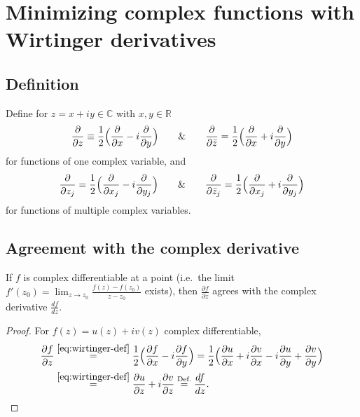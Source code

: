 \documentclass[../../main.tex]{subfiles}
\begin{document}
\section{Minimizing complex functions with Wirtinger derivatives}
\label{sec:wirtinger-derivatives}

\subsection{Definition}

Define for $z=x+iy\in\mathbb C$ with $x,y\in\mathbb R$
\begin{equation}
\frac{\partial}{\partial z}\equiv\frac12\Bigl(\frac{\partial}{\partial x}-i\frac{\partial}{\partial y}\Bigr)
\qquad\&\qquad
\frac{\partial}{\partial\bar z}=\frac12\Bigl(\frac{\partial}{\partial x}+i\frac{\partial}{\partial y}\Bigr)
\label{eq:wirtinger-def}
\end{equation}
for functions of one complex variable, and
\begin{equation}
\frac{\partial}{\partial z_j}=\frac12\Bigl(\frac{\partial}{\partial x_j}-i\frac{\partial}{\partial y_j}\Bigr)
\qquad\&\qquad
\frac{\partial}{\partial\bar z_j}=\frac12\Bigl(\frac{\partial}{\partial x_j}+i\frac{\partial}{\partial y_j}\Bigr)
\end{equation}
for functions of multiple complex variables.

\subsection{Agreement with the complex derivative}

If $f$ is complex differentiable at a point (i.e.\ the limit
$f'(z_0)=\lim_{z\to z_0}\frac{f(z)-f(z_0)}{z-z_0}$ exists), then $\frac{\partial f}{\partial z}$
agrees with the complex derivative $\frac{df}{dz}$.

\begin{proof}
For $f(z)=u(z)+iv(z)$ complex differentiable,
\begin{align}
\frac{\partial f}{\partial z}
&\overset{\eqref{eq:wirtinger-def}}{=}
\frac12\Bigl(\frac{\partial f}{\partial x}-i\frac{\partial f}{\partial y}\Bigr)
=\frac12\Bigl(\frac{\partial u}{\partial x}+i\frac{\partial v}{\partial x}
-i\frac{\partial u}{\partial y}+\frac{\partial v}{\partial y}\Bigr)\notag\\
&\overset{\eqref{eq:wirtinger-def}}{=}\frac{\partial u}{\partial z}+i\frac{\partial v}{\partial z}
\overset{\text{Def.}}{=}\frac{df}{dz}.
\end{align}
\end{proof}
\end{document}
